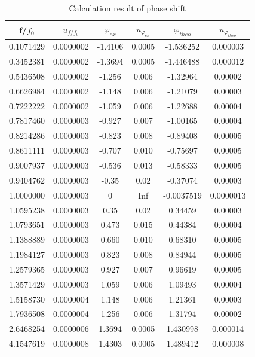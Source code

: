 \documentclass[12pt,a4paper]{article}
\begin{document}
\begin{table}[H]
    \centering
    \begin{tabular}{|c|c|c|c|c|c|}
    \hline
     f/$f_0$ & $u_{f/f_0}$ & $\varphi_{ex}$  & $u_{\varphi_{ex}}$ & $\varphi_{theo}$  &  $u_{\varphi_{theo}}$ \\ \hline
    0.1071429 & 0.0000002 & -1.4106 & 0.0005 & -1.536252  & 0.000003  \\ \hline
    0.3452381  & 0.0000002  & -1.3694 & 0.0005 & -1.446488  & 0.000012  \\ \hline
    0.5436508  & 0.0000002  & -1.256 & 0.006 & -1.32964   & 0.00002   \\ \hline
    0.6626984  & 0.0000002  & -1.148 & 0.006 & -1.21079   & 0.00003   \\ \hline
    0.7222222  & 0.0000002  & -1.059 & 0.006 & -1.22688   & 0.00004   \\ \hline
    0.7817460  & 0.0000003  & -0.927 & 0.007 & -1.00165   & 0.00004   \\ \hline
    0.8214286  & 0.0000003  & -0.823 & 0.008 & -0.89408   & 0.00005   \\ \hline
    0.8611111  & 0.0000003  & -0.707 & 0.010 & -0.75697   & 0.00005   \\ \hline
    0.9007937  & 0.0000003  & -0.536 & 0.013 & -0.58333   & 0.00005   \\ \hline
    0.9404762  & 0.0000003  & -0.35  & 0.02  & -0.37074   & 0.00003   \\ \hline
    1.0000000  & 0.0000003  & 0      & Inf   & -0.0037519 & 0.0000013 \\ \hline
    1.0595238  & 0.0000003  & 0.35   & 0.02  & 0.34459    & 0.00003   \\ \hline
    1.0793651  & 0.0000003  & 0.473  & 0.015 & 0.44384    & 0.00004   \\ \hline
    1.1388889  & 0.0000003  & 0.660  & 0.010 & 0.68310    & 0.00005   \\ \hline
    1.1984127  & 0.0000003 & 0.823  & 0.008 & 0.84944    & 0.00005   \\ \hline
    1.2579365  & 0.0000003  & 0.927  & 0.007 & 0.96619    & 0.00005   \\ \hline
    1.3571429  & 0.0000003  & 1.059  & 0.006 & 1.09493    & 0.00004   \\ \hline
    1.5158730  & 0.0000004  & 1.148  & 0.006 & 1.21361    & 0.00003   \\ \hline
    1.7936508  & 0.0000004  & 1.256  & 0.006 & 1.31794    & 0.00002   \\ \hline
    2.6468254  & 0.0000006  & 1.3694  & 0.0005 & 1.430998   & 0.000014  \\ \hline
    4.1547619   & 0.0000008   & 1.4303  & 0.0005 & 1.489412   & 0.000008  \\ \hline
    \end{tabular}
    \caption{Calculation result of phase shift}
\end{table}
\end{document}
